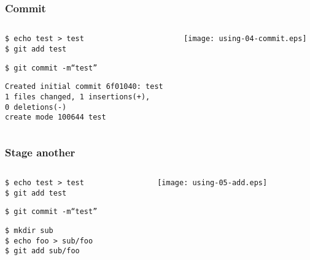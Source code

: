 \documentclass[english]{beamer}
\newcommand{\CMD}[1]{%
\texttt{\textcolor{code-green}{#1}}%
}
\newcommand{\cmd}[1]{%
\texttt{\textcolor{code-orange}{#1}}%
}
\newcommand{\fnt}[1]{%
\texttt{\textcolor{code-gray}{#1}}%
}
\begin{document}
\begin{frame}
\frametitle{Commit}
\begin{columns}[t]
        \begin{column}[T]{.5\textwidth}
                \cmd{\$ echo test > test} \\
                \CMD{\$ git add test}

                \vspace{.1\textheight}

                \CMD{\$ git commit -m``test''} \\
                {\tiny
                \fnt{Created initial commit 6f01040: test \\
                       1 files changed, 1 insertions(+), \\ 0 deletions(-) \\
                       create mode 100644 test}
                }
        \end{column}
        \begin{column}[T]{.5\textwidth}
                \texttt{[image: using-04-commit.eps]}
        \end{column}
\end{columns}
\end{frame}

\begin{frame}
\frametitle{Stage another}
\begin{columns}[t]
        \begin{column}[T]{.5\textwidth}
                \cmd{\$ echo test > test} \\
                \CMD{\$ git add test}

                \vspace{.1\textheight}

                \CMD{\$ git commit -m``test''} \\

                \vspace{.1\textheight}

                \cmd{\$ mkdir sub} \\
                \cmd{\$ echo foo > sub/foo} \\
                \CMD{\$ git add sub/foo}
        \end{column}
        \begin{column}[T]{.5\textwidth}

                \texttt{[image: using-05-add.eps]}

        \end{column}
\end{columns}
\end{frame}
\end{document}
